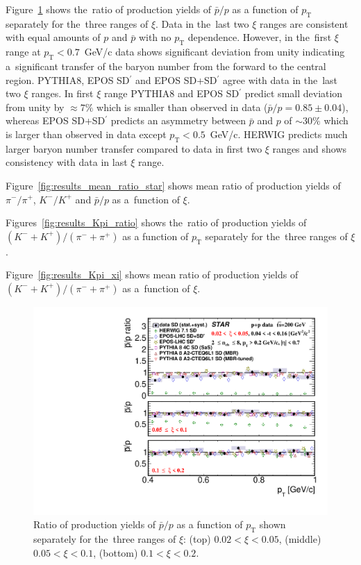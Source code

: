 Figure~\ref{fig:results_star_proton} shows the~ratio of production yields of $\bar{p}/p$ as a function of $p_\textrm{T}$  separately for the~three ranges of $\xi$. Data in the~last two $\xi$ ranges are consistent with equal amounts of $p$ and $\bar{p}$ with no $p_\textrm{T}$ dependence. However, in the~first $\xi$ range at $p_\textrm{T}<0.7$~GeV/c data shows significant deviation from unity indicating a~significant transfer of the baryon number from the forward to the central region. PYTHIA8, EPOS SD$^\prime$ and EPOS SD+SD$^\prime$ agree with data in the~last two $\xi$ ranges. In first $\xi$ range PYTHIA8 and EPOS SD$^\prime$ predict small deviation from unity by $\approx7\%$ which is smaller than observed in data ($\bar{p}/p=0.85\pm 0.04$), whereas EPOS SD+SD$^\prime$ predicts an asymmetry between $\bar{p}$ and $p$ of $\sim30\%$  which is larger than observed in data except $p_\textrm{T}<0.5$~GeV/c. HERWIG predicts much larger baryon number transfer compared to data in first two $\xi$ ranges and shows consistency with data in last $\xi$ range. 

Figure~\ref{fig:results_mean_ratio_star} shows mean ratio of production yields of $\pi^-/\pi^+$, $K^-/K^+$ and $\bar{p}/p$ as a~function of  $\xi$.

Figures~\ref{fig:results_Kpi_ratio} shows the~ratio of production yields of $\left(K^-+K^+\right)/\left(\pi^-+\pi^+\right)$ as a function of $p_\textrm{T}$  separately for the~three ranges of $\xi$. 

Figure~\ref{fig:results_Kpi_xi} shows mean ratio of production yields of $\left(K^-+K^+\right)/\left(\pi^-+\pi^+\right)$ as a~function of  $\xi$.

\begin{figure}[b!]
	\centering
	\includegraphics[width=.99\textwidth,page=1]{chapters/chrgSTAR/img/results/particleRatio_prt_2.pdf}
	\caption{Ratio of production yields of $\bar{p}/p$ as a function of $p_\textrm{T}$ shown separately for the~three ranges of $\xi$: (top) $0.02<\xi<0.05$, (middle) $0.05<\xi<0.1$, (bottom) $0.1<\xi<0.2$.}
	\label{fig:results_star_proton}
	
\end{figure}

